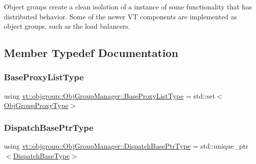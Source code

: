 Object groups create a clean isolation of a instance of some functionality that has distributed behavior. Some of the newer VT components are implemented as object groups, such as the load balancers. 

\subsection{Member Typedef Documentation}
\mbox{\label{structvt_1_1objgroup_1_1_obj_group_manager_a497383a759f7426e824b4f7475b3d5d3}} 
\subsubsection{\texorpdfstring{Base\+Proxy\+List\+Type}{BaseProxyListType}}
{\footnotesize\ttfamily using \hyperlink{structvt_1_1objgroup_1_1_obj_group_manager_a497383a759f7426e824b4f7475b3d5d3}{vt\+::objgroup\+::\+Obj\+Group\+Manager\+::\+Base\+Proxy\+List\+Type} =  std\+::set$<$\hyperlink{namespacevt_ad7cae989df485fccca57f0792a880a8e}{Obj\+Group\+Proxy\+Type}$>$}

\mbox{\label{structvt_1_1objgroup_1_1_obj_group_manager_a8f2ded4cfa63faa119c2bd550764878f}} 
\subsubsection{\texorpdfstring{Dispatch\+Base\+Ptr\+Type}{DispatchBasePtrType}}
{\footnotesize\ttfamily using \hyperlink{structvt_1_1objgroup_1_1_obj_group_manager_a8f2ded4cfa63faa119c2bd550764878f}{vt\+::objgroup\+::\+Obj\+Group\+Manager\+::\+Dispatch\+Base\+Ptr\+Type} =  std\+::unique\+\_\+ptr$<$\hyperlink{structvt_1_1objgroup_1_1_obj_group_manager_ae89a82f6bfca9bbd007791f1cac88f8f}{Dispatch\+Base\+Type}$>$}

\mbox{\label{structvt_1_1objgroup_1_1_obj_group_manager_ae89a82f6bfca9bbd007791f1cac88f8f}} 

